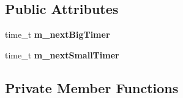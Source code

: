 \subsection*{Public Attributes}
\begin{DoxyCompactItemize}
\item 
time\_\-t {\bfseries m\_\-nextBigTimer}\label{classKademlia_1_1CRoutingZone_a3d8b981a6fc951c2dd70e78fa2682b5a}

\item 
time\_\-t {\bfseries m\_\-nextSmallTimer}\label{classKademlia_1_1CRoutingZone_a3cac929aa5e7be17067c59a9cc9b4f83}

\end{DoxyCompactItemize}
\subsection*{Private Member Functions}
